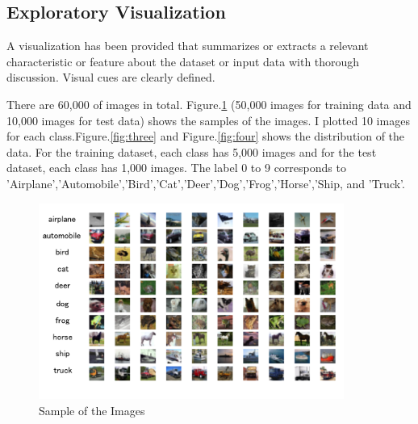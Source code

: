 \subsection{Exploratory Visualization}
A visualization has been provided that summarizes or extracts a relevant characteristic or feature about the dataset or input data with thorough discussion. Visual cues are clearly defined.


There are 60,000 of images in total. Figure.\ref{fig:two} (50,000 images for training data and 10,000 images for test data) shows the samples of the images. I plotted 10 images for each class.Figure.\ref{fig:three} and Figure.\ref{fig:four} shows the distribution of the data. For the training dataset, each class has 5,000 images and for the test dataset, each class has 1,000 images.
The label 0 to 9 corresponds to 'Airplane','Automobile','Bird','Cat','Deer','Dog','Frog','Horse','Ship, and 'Truck'.
\begin{figure}[htbp]

\begin{center}
\includegraphics[width=10cm]{picture/random_sample.png}
\end{center}
\caption{Sample of the Images}
\label{fig:two}

\end{figure}


